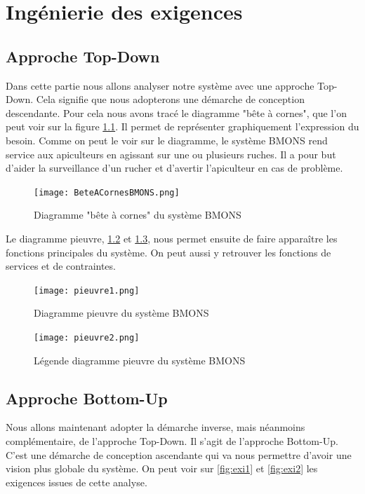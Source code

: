﻿\chapter{Ingénierie des exigences}
\section{Approche Top-Down}
\vspace{1.5cm}
Dans cette partie nous allons analyser notre système avec une approche Top-Down. Cela signifie que nous adopterons une démarche de conception descendante. Pour cela nous avons tracé le diagramme "bête à cornes", que l'on peut voir sur la figure \ref{fig:beteacorne}. Il permet de représenter graphiquement l'expression du besoin. Comme on peut le voir sur le diagramme, le système BMONS rend service aux apiculteurs en agissant sur une ou plusieurs ruches. Il a pour but d'aider la surveillance d'un rucher et d'avertir l'apiculteur en cas de problème.


\begin{figure}[h!]
\centering\texttt{[image: BeteACornesBMONS.png]}
\caption{\label{fig:beteacorne} Diagramme "bête à cornes" du système BMONS}
\end{figure}

Le diagramme pieuvre, \ref{fig:diagpieuvre1} et \ref{fig:diagpieuvre2}, nous permet ensuite de faire apparaître les fonctions principales du système. On peut aussi y retrouver les fonctions de services et de contraintes.

 
\begin{figure}[h!]
\centering\texttt{[image: pieuvre1.png]}
\caption{\label{fig:diagpieuvre1} Diagramme pieuvre du système BMONS}
\end{figure}

\begin{figure}[h!]
\centering\texttt{[image: pieuvre2.png]}
\caption{\label{fig:diagpieuvre2} Légende diagramme pieuvre du système BMONS}
\end{figure}

\clearpage

\section{Approche Bottom-Up}

\vspace{1.5cm}
Nous allons maintenant adopter la démarche inverse, mais néanmoins complémentaire, de l'approche Top-Down. Il s'agit de l'approche Bottom-Up. C'est une démarche de conception ascendante qui va nous permettre d'avoir une vision plus globale du système. On peut voir sur \ref{fig:exi1} et \ref{fig:exi2} les exigences issues de cette analyse.

